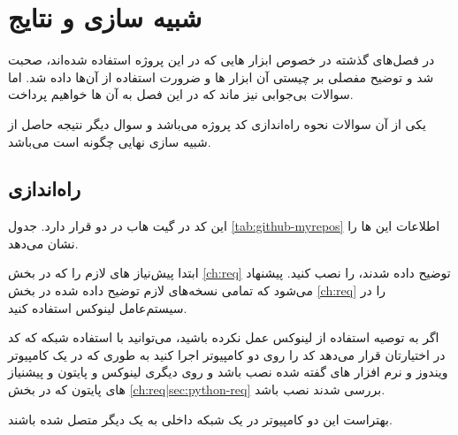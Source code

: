 \chapter{شبیه سازی و نتایج}\label{ch:resault}
در فصل‌های گذشته در خصوص ابزار هایی که در این پروژه استفاده شده‌اند، صحبت شد و توضیح مفصلی بر چیستی آن ابزار ها و ضرورت استفاده از آن‌ها داده شد. اما سوالات بی‌جوابی نیز ماند که در این فصل به آن ها خواهیم پرداخت.

یکی از آن سوالات نحوه راه‌اندازی کد پروژه می‌باشد و سوال دیگر نتیجه حاصل از شبیه سازی نهایی چگونه است می‌باشد.
\section{راه‌اندازی}\label{ch:resault|sec:launch}
این کد در گیت هاب در دو 
قرار دارد.
جدول 
\ref{tab:github-myrepos}
اطلاعات این ها
 را نشان می‌دهد.
 
\begin{table}
\caption{اطلاعات های پروژه در گیت‌هاب}
\label{tab:github-myrepos}
\end{table}

 ابتدا پیش‌نیاز های لازم را که در بخش
\ref{ch:req}
توضیح داده شدند، را نصب کنید. پیشنهاد می‌شود که تمامی نسخه‌های لازم توضیح داده شده در بخش \ref{ch:req} را در سیستم‌عامل لینوکس استفاده کنید. 

اگر به توصیه استفاده از لینوکس عمل نکرده باشید، می‌توانید با استفاده شبکه که کد در اختیارتان قرار می‌دهد کد را روی دو کامپیوتر اجرا کنید به طوری که در یک کامپیوتر ویندوز و نرم افزار های گفته شده نصب باشد و روی دیگری لینوکس و پایتون و پیشنیاز های پایتون که در بخش 
\ref{ch:req|sec:python-req}
بررسی شدند نصب باشد. 
\begin{note}
بهتراست این دو کامپیوتر در یک شبکه داخلی به یک دیگر متصل شده باشند.
\end{note}

